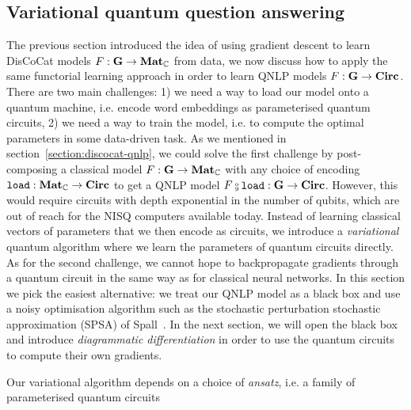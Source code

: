 
\subsection{Variational quantum question answering}

The previous section introduced the idea of using gradient descent to learn DisCoCat models $F : \mathbf{G} \to \mathbf{Mat}_{\mathbb{C}}$ from data, we now discuss how to apply the same functorial learning approach in order to learn QNLP models $F : \mathbf{G} \to \mathbf{Circ}$.
There are two main challenges: 1) we need a way to load our model onto a quantum machine, i.e. encode word embeddings as parameterised quantum circuits, 2) we need a way to train the model, i.e. to compute the optimal parameters in some data-driven task.
As we mentioned in section~\ref{section:discocat-qnlp}, we could solve the first challenge by post-composing a classical model $F : \mathbf{G} \to \mathbf{Mat}_{\mathbb{C}}$ with any choice of encoding $\mathtt{load} : \mathbf{Mat}_{\mathbb{C}} \to \mathbf{Circ}$ to get a QNLP model $F \fcmp \mathtt{load} : \G \to \mathbf{Circ}$.
However, this would require circuits with depth exponential in the number of qubits, which are out of reach for the NISQ computers available today.
Instead of learning classical vectors of parameters that we then encode as circuits, we introduce a \emph{variational} quantum algorithm where we learn the parameters of quantum circuits directly.
As for the second challenge, we cannot hope to backpropagate gradients through a quantum circuit in the same way as for classical neural networks.
In this section we pick the easiest alternative: we treat our QNLP model as a black box and use a noisy optimisation algorithm such as the stochastic perturbation stochastic approximation (SPSA) of Spall~\cite{Spall98}.
In the next section, we will open the black box and introduce \emph{diagrammatic differentiation} in order to use the quantum circuits to compute their own gradients.

Our variational algorithm depends on a choice of \emph{ansatz}, i.e. a family of parameterised quantum circuits

%

\cite{MaEtAl19}
